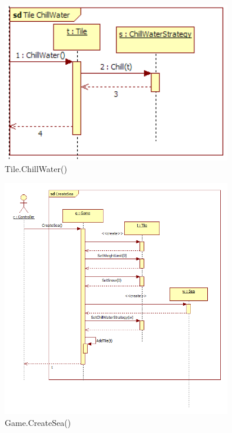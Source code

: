\begin{figure}[H]
	\begin{center}
		\includegraphics[width=10cm]{chapters/chapter03/seqdiag/Tile_ChillWater.png}
		\caption{Tile.ChillWater()}
		\label{fig:TileChillWater}
	\end{center}
\end{figure}
\begin{figure}[H]
	\begin{center}
		\includegraphics[width=10cm]{chapters/chapter03/seqdiag/Game_CreateSea.png}
		\caption{Game.CreateSea()}
		\label{fig:GameCreateSea}
	\end{center}
\end{figure}
